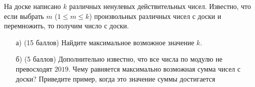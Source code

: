 
На доске написано $k$ различных ненулевых действительных чисел.
	Известно, что если выбрать \linebreak $m$ 
	($1 \leq m \leq k$) произвольных
	различных чисел с доски и перемножить, то
	получим число с доски.
    
    \begin{enumerate}
        \item[а)] (15 баллов) Найдите максимальное возможное значение 
	$k$.
        \item[б)] (5 баллов) Дополнительно известно, что все числа 
	по модулю не превосходят $2019$. Чему 
	равняется максимально возможная сумма
	чисел с доски? Приведите пример, когда это
    значение суммы достигается
    \end{enumerate}